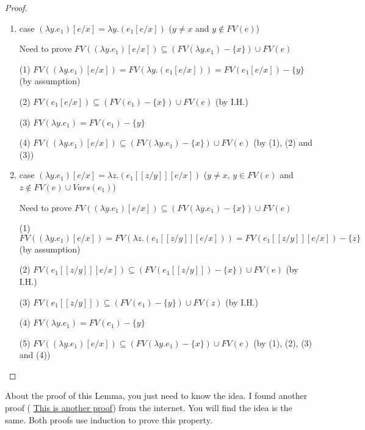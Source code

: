 \documentclass[12pt]{article}
\begin{document}
\begin{proof}
\begin{enumerate}
		(2) $FV((\lambda x.e_1)[e/x]) \subseteq (FV(\lambda x.e_1) -\{x\}) \cup FV(e)$ (by (1))
		
		\item case $(\lambda y.e_1)[e/x] = \lambda y.(e_1[e/x])$ ($y \neq x$ and $y \notin FV(e)$)
		
		Need to prove $FV((\lambda y.e_1)[e/x]) \subseteq (FV(\lambda y.e_1) -\{x\}) \cup FV(e)$
		
		(1) $FV((\lambda y.e_1)[e/x]) = FV(\lambda y.(e_1[e/x])) = FV(e_1[e/x]) - \{y\}$ (by assumption)
		
		(2) $FV(e_1[e/x]) \subseteq (FV(e_1) - \{x\}) \cup FV(e)$ (by I.H.)
		
		(3) $FV(\lambda y.e_1) = FV(e_1) -\{y\}$
		
		(4) $FV((\lambda y.e_1)[e/x]) \subseteq (FV(\lambda y.e_1) -\{x\}) \cup FV(e)$ (by (1), (2) and (3))
		
		\item case $(\lambda y.e_1)[e/x] = \lambda z.(e_1[[z/y]][e/x])$ ($y \neq x$, $y \in FV(e)$ and $z \notin FV(e) \cup Vars(e_1)$)
		
		Need to prove $FV((\lambda y.e_1)[e/x]) \subseteq (FV(\lambda y.e_1) -\{x\}) \cup FV(e)$
		
		(1) $FV((\lambda y.e_1)[e/x]) = FV(\lambda z.(e_1[[z/y]][e/x])) = FV(e_1[[z/y]][e/x]) - \{z\}$ (by assumption)
		
		(2) $FV(e_1[[z/y]][e/x]) \subseteq (FV(e_1[[z/y]]) - \{x\}) \cup FV(e)$ (by I.H.)
		
		(3) $FV(e_1[[z/y]]) \subseteq (FV(e_1) - \{y\}) \cup FV(z)$ (by I.H.)
		
		(4) $FV(\lambda y.e_1) = FV(e_1) - \{y\}$
		
		(5) $FV((\lambda y.e_1)[e/x]) \subseteq (FV(\lambda y.e_1) -\{x\}) \cup FV(e)$ (by (1), (2), (3) and (4))
		
	\end{enumerate}
\end{proof}
About the proof of this Lemma, you just need to know the idea. I found another proof ( \href{https://www.cs.bham.ac.uk/research/projects/poplog/paradigms_lectures/lambda_calculus_html.d/substitution.html}{This is another proof}) from the internet. You will find the idea is the same. Both proofs use induction to prove this property.
\end{document}

